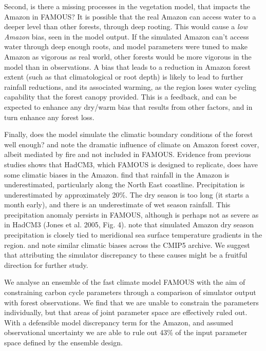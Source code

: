 \documentclass[esd, article]{copernicus} %
\begin{document}
Second, is there a missing processes in the vegetation model, that impacts the Amazon in FAMOUS? It is possible that the real Amazon can access water to a deeper level than other forests, through deep rooting. This would cause a \emph{low Amazon} bias, seen in the model output. If the simulated Amazon can't access water through deep enough roots, and model parameters were tuned to make Amazon as vigorous as real world, other forests would be more vigorous in the model than in observations. A bias that leads to a reduction in Amazon forest extent (such as that climatological or root depth) is likely to lead to further rainfall reductions, and its associated warming, as the region loses water cycling capability that the forest canopy provided.  This is a feedback, and can be expected to enhance any dry/warm bias that results from other factors, and in turn enhance any forest loss.

Finally, does the model simulate the climatic boundary conditions of the forest well enough? \cite{malhi2009amazon} and \cite{staver2011determinants} note the dramatic influence of climate on Amazon forest cover, albeit mediated by fire and not included in FAMOUS. Evidence from previous studies shows that HadCM3, which FAMOUS is designed to replicate, does have some climatic biases in the Amazon. \cite{cox2004amazon} find that rainfall in the Amazon is underestimated, particularly along the North East coastline. Precipitation is underestimated by approximately 20\%. The dry season is too long (it starts a month early), and there is an underestimate of wet season rainfall. This precipitation anomaly persists in FAMOUS, although is perhaps not as severe as in HadCM3 (Jones et al. 2005, Fig.  4). \cite{good2008objective} note that simulated Amazon dry season precipitation is closely tied to meridional sea surface temperature gradients in the region. \cite{joetzjer2013amazon} and \cite{yin2012precipitation} note similar climatic biases across the CMIP5 archive. We suggest that attributing the simulator discrepancy to these causes might be a fruitful direction for further study.

\conclusions \label{sec:conclusions} %

We analyse an ensemble of the fast climate model FAMOUS with the aim of constraining carbon cycle parameters through a comparison of simulator output with forest observations. We find that we are unable to constrain the parameters individually, but that areas of joint parameter space are effectively ruled out. With a defensible model discrepancy term for the Amazon, and assumed observational uncertainty we are able to rule out 43\% of the input parameter space defined by the ensemble design.
\end{document}
